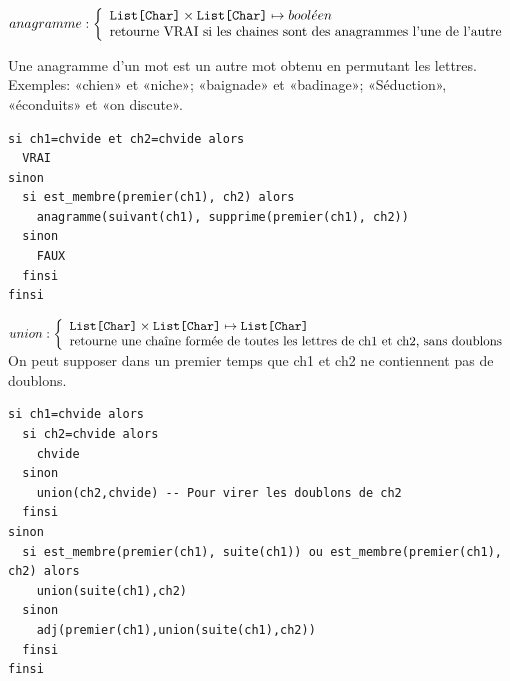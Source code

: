 \documentclass[10pt]{article}\usepackage[correction,nu]{esial}
\begin{document}
\begin{Question}
  $anagramme: \left\{
    \begin{array}{l}
      \text{\texttt{List[Char]}}\times \text{\texttt{List[Char]}}\mapsto bool\acute{e}en\\
      \text{retourne VRAI si les chaines sont des anagrammes l'une de l'autre}
    \end{array}\right.$  

  Une anagramme d'un mot est un autre mot obtenu en permutant les lettres.
  Exemples: «chien» et «niche»; «baignade» et «badinage»; «Séduction»,
  «éconduits» et «on discute».
\end{Question}
\begin{Reponse}
  \begin{Verbatim}[label=anagramme(ch1\quotesinglbase ch2)]
si ch1=chvide et ch2=chvide alors
  VRAI
sinon
  si est_membre(premier(ch1), ch2) alors
    anagramme(suivant(ch1), supprime(premier(ch1), ch2))
  sinon
    FAUX
  finsi
finsi
  \end{Verbatim}
\end{Reponse}

\begin{Question}
  $union: \left\{
    \begin{array}{l}
      \text{\texttt{List[Char]}}\times \text{\texttt{List[Char]}}\mapsto \text{\texttt{List[Char]}}\\
      \text{retourne une chaîne formée de toutes les lettres de ch1 et ch2,
        sans doublons}
    \end{array}\right.$    
  On peut supposer dans un premier temps que ch1 et ch2 ne contiennent pas de
  doublons.
\end{Question}
\begin{Reponse}
  \begin{Verbatim}[label=union(ch1\quotesinglbase ch2)]
si ch1=chvide alors
  si ch2=chvide alors
    chvide
  sinon
    union(ch2,chvide) -- Pour virer les doublons de ch2
  finsi
sinon
  si est_membre(premier(ch1), suite(ch1)) ou est_membre(premier(ch1), ch2) alors
    union(suite(ch1),ch2)
  sinon
    adj(premier(ch1),union(suite(ch1),ch2))
  finsi
finsi    
  \end{Verbatim}
\end{Reponse}
\end{document}
